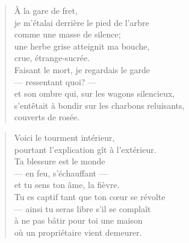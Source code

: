 \newpage

\vspace*{-15mm}
\centeredornament




\begin{verse}
  À la gare de fret, \\
  je m'étalai derrière le pied de l'arbre \\
  comme une masse de silence; \\
  une herbe grise atteignit ma bouche, \\
  crue, étrange-sucrée. \\
  Faisant le mort, je regardais le garde \\
  --- ressentant quoi? --- \\
  et son ombre qui, sur les wagons silencieux, \\
  s'entêtait à bondir sur les charbons reluisants,\hspace*{-4mm} \\
  couverts de rosée.
\end{verse}

\bigskip



\begin{verse}
  Voici le tourment intérieur, \\
  pourtant l'explication gît à l'extérieur. \\
  Ta blessure est le monde \\
  --- en feu, s'échauffant --- \\
  et tu sens ton âme, la fièvre. \\
  Tu es captif tant que ton cœur se révolte \\
  --- ainsi tu seras libre s'il se complaît \\
  à ne pas bâtir pour toi une maison \\
  où un propriétaire vient demeurer.
\end{verse}

